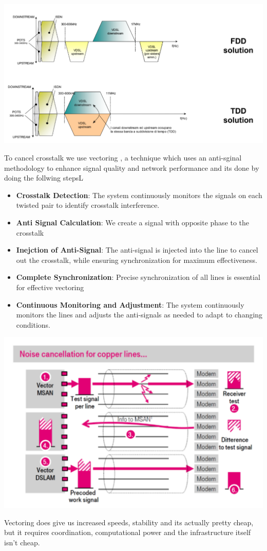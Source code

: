 \documentclass[11pt, a4paper]{article}
\begin{document}
\begin{center}
    \includegraphics[scale=0.5]{img/AccessNetworks/VDSL/types.png}
\end{center}
To cancel crosstalk we use vectoring , a technique which uses an anti-sginal methodology to enhance signal quality and network performance and its done by doing the follwing stepsL
\begin{itemize}
    \item \textbf{Crosstalk Detection}: The system continuously monitors the signals on each twisted pair to identify crosstalk interference.
    \item \textbf{Anti Signal Calculation}: We create a signal with opposite phase to the crosstalk
    \item \textbf{Inejction of Anti-Signal}: The anti-signal is injected into the line to cancel out the crosstalk, while ensuring synchronization for maximum effectiveness.
    \item \textbf{Complete Synchronization}: Precise synchronization of all lines is essential for effective vectoring
    \item \textbf{Continuous Monitoring and Adjustment}: The system continuously monitors the lines and adjusts the anti-signals as needed to adapt to changing conditions.
\end{itemize}
\begin{center}
    \includegraphics[scale=0.5]{img/AccessNetworks/VDSL/vectoring.png}
\end{center}
Vectoring does give us increased speeds, stability and its actually pretty cheap, but it requires coordination, computational power and the infrastructure itself isn't cheap.
\end{document}
